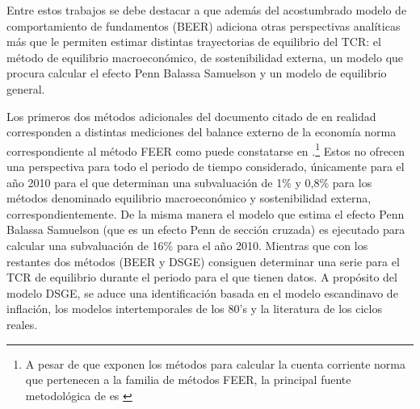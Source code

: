 \documentclass[12pt,letterpaper]{article}
\begin{document}
Entre estos trabajos se debe destacar a \cite{cerezo2011tipo} que además del acostumbrado modelo de comportamiento de fundamentos (BEER) adiciona otras perspectivas analíticas más que le permiten estimar distintas trayectorias de equilibrio del TCR: el método de equilibrio macroeconómico, de sostenibilidad externa, un modelo que procura calcular el efecto Penn Balassa Samuelson y un modelo de equilibrio general. 

Los primeros dos métodos adicionales del documento citado de \cite{cerezo2011tipo} en realidad corresponden a distintas mediciones del balance externo de la economía norma correspondiente al método FEER como puede constatarse en \cite{bussiere2010methodological}.\footnote{A pesar de que \cite{bussiere2010methodological} exponen los métodos para calcular la cuenta corriente norma que pertenecen a la familia de métodos FEER, la principal fuente metodológica de \cite{cerezo2011tipo} es \cite{isard2007equilibrium}} Estos no ofrecen una perspectiva para todo el periodo de tiempo considerado, únicamente para el año 2010 para el que determinan una subvaluación de 1\% y 0,8\% para los métodos denominado equilibrio macroeconómico y sostenibilidad externa, correspondientemente. De la misma manera el modelo que estima el efecto Penn Balassa Samuelson (que es un efecto Penn de sección cruzada) es ejecutado para calcular una subvaluación de 16\% para el año 2010. Mientras que con los restantes dos métodos (BEER y DSGE) consiguen determinar una serie para el TCR de equilibrio durante el periodo para el que tienen datos. A propósito del modelo DSGE, se aduce una identificación basada en el modelo escandinavo de inflación, los modelos intertemporales de los 80's y la literatura de los ciclos reales.
\end{document}

